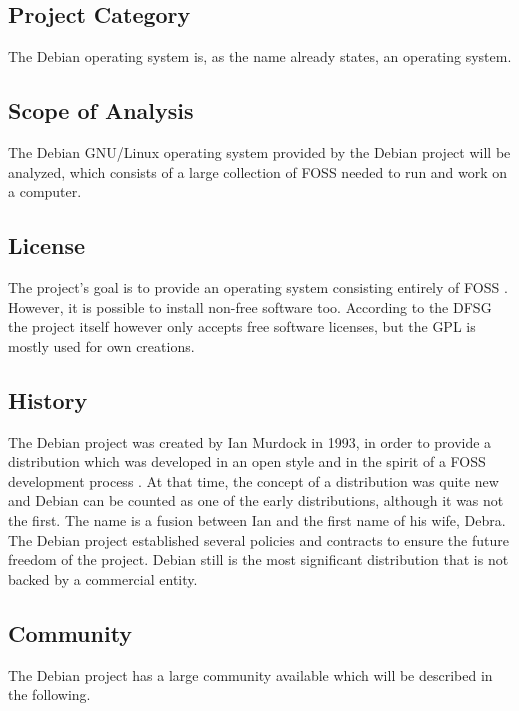 \subsection{Project Category}

The Debian operating system is, as the name already states, an operating
system.

\subsection{Scope of Analysis}

The Debian \ac{GNU}/Linux operating system provided by the Debian project will
be analyzed, which consists of a large collection of \ac{FOSS} needed to run
and work on a computer.

\subsection{License}

The project's goal is to provide an operating system consisting entirely of
\ac{FOSS} \cite{DebianLicense,DebianFAQ}. However, it is possible to install
non-free software too. According to the \ac{DFSG} the project itself however
only accepts free software licenses, but the \ac{GPL} is mostly used for own
creations.

\subsection{History}

The Debian project was created by Ian Murdock in 1993, in order to provide a
distribution which was developed in an open style and in the spirit of a
\ac{FOSS} development process \cite{DebianAbout,DebianHistory,Sadowski2008}. At
that time, the concept of a distribution was quite new and Debian can be
counted as one of the early distributions, although it was not the first. The
name is a fusion between Ian and the first name of his wife, Debra. The Debian
project established several policies and contracts to ensure the future freedom
of the project. Debian still is the most significant distribution that is not
backed by a commercial entity.

\subsection{Community}

The Debian project has a large community available which will be described in
the following.

